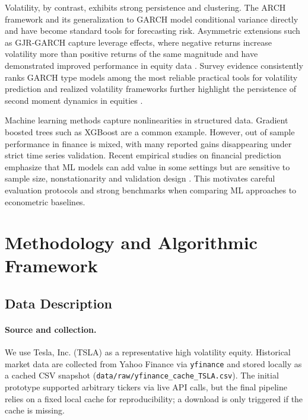 \documentclass[11pt,a4paper]{article}
\begin{document}
\noindent Volatility, by contrast, exhibits strong persistence and clustering. The ARCH framework \parencite{Engle1982} and its generalization to GARCH \parencite{Bollerslev1986} model conditional variance directly and have become standard tools for forecasting risk. Asymmetric extensions such as GJR-GARCH \parencite{Glosten1993} capture leverage effects, where negative returns increase volatility more than positive returns of the same magnitude and have demonstrated improved performance in equity data \parencite{Hansen2005}. Survey evidence consistently ranks GARCH type models among the most reliable practical tools for volatility prediction \parencite{Poon2003} and realized volatility frameworks further highlight the persistence of second moment dynamics in equities \parencite{Andersen2003}.

\noindent Machine learning methods capture nonlinearities in structured data. Gradient boosted trees such as XGBoost \parencite{Chen2016} are a common example. However, out of sample performance in finance is mixed, with many reported gains disappearing under strict time series validation. Recent empirical studies on financial prediction emphasize that ML models can add value in some settings but are sensitive to sample size, nonstationarity and validation design \parencite{Gu2020,Krauss2017}. This motivates careful evaluation protocols and strong benchmarks when comparing ML approaches to econometric baselines.
\endgroup

\section{Methodology and Algorithmic Framework}
\label{sec:methodology}

\subsection{Data Description}
\label{subsec:data}

\paragraph{Source and collection.}
We use Tesla, Inc. (TSLA) as a representative high volatility equity. Historical market data are collected from Yahoo Finance via \texttt{yfinance} and stored locally as a cached CSV snapshot (\texttt{data/raw/yfinance\_cache\_TSLA.csv}). The initial prototype supported arbitrary tickers via live API calls, but the final pipeline relies on a fixed local cache for reproducibility; a download is only triggered if the cache is missing.
\end{document}
